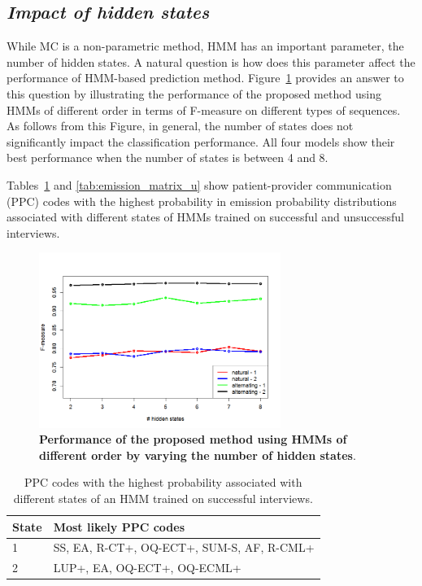 \documentclass{amia_summit_2018}
\begin{document}
\subsection*{\textit{Impact of hidden states}}
While MC is a non-parametric method, HMM has an important parameter, the number of hidden states. A natural question is how does this parameter affect the performance of HMM-based prediction  method. Figure~\ref{fig:hidden-states} provides an answer to this question by illustrating the performance of the proposed method using HMMs of different order in terms of F-measure on different types of sequences. As follows from this Figure, in general, the number of states does not significantly impact the classification performance. All four models show their best performance when the number of states is between 4 and 8. 

Tables~\ref{tab:emission_matrix_s} and \ref{tab:emission_matrix_u} show patient-provider communication (PPC) codes with the highest probability in emission probability distributions associated with different states of HMMs trained on successful and unsuccessful interviews.\\

\begin{figure}[!htb]
    \centering
    \includegraphics[width=0.70\textwidth]{figures/hidden-states.png}
    \caption{\textbf{Performance of the proposed method using HMMs of different order by varying the number of hidden states}.}
    \label{fig:hidden-states}
\end{figure}

\begin{table}[!htb]
\centering
\caption{PPC codes with the highest probability associated with different states of an HMM trained on successful interviews.}
\label{tab:emission_matrix_s}
  \begin{tabular}{|l|l|}
  \hline
   \textbf{State} & \textbf{Most likely PPC codes} \\\hline 
1 & SS, EA, R-CT+, OQ-ECT+, SUM-S, AF, R-CML+ \\\hline           
2 & LUP+, EA, OQ-ECT+, OQ-ECML+  \\\hline    
  \end{tabular}
\end{table} 
\end{document}
